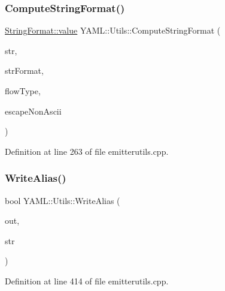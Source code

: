 \subsubsection{\texorpdfstring{ComputeStringFormat()}{ComputeStringFormat()}}
{\footnotesize\ttfamily \mbox{\hyperlink{struct_y_a_m_l_1_1_string_format_aa87d77d0f60417355a95432f16b226e0}{String\+Format\+::value}} Y\+A\+M\+L\+::\+Utils\+::\+Compute\+String\+Format (\begin{DoxyParamCaption}\item[{const \mbox{\hyperlink{glad_8h_ac83513893df92266f79a515488701770}{std\+::string}} \&}]{str,  }\item[{\mbox{\hyperlink{namespace_y_a_m_l_a67c320aa50d3de7ecba1d0b8775dd684}{E\+M\+I\+T\+T\+E\+R\+\_\+\+M\+A\+N\+IP}}}]{str\+Format,  }\item[{\mbox{\hyperlink{struct_y_a_m_l_1_1_flow_type_afc7b0fab097e599c9b49918739e1b5cc}{Flow\+Type\+::value}}}]{flow\+Type,  }\item[{bool}]{escape\+Non\+Ascii }\end{DoxyParamCaption})}



Definition at line 263 of file emitterutils.\+cpp.

\mbox{\label{namespace_y_a_m_l_1_1_utils_a7073e23b2ae04bf248abd3c6fd26a90a}} 
\subsubsection{\texorpdfstring{WriteAlias()}{WriteAlias()}}
{\footnotesize\ttfamily bool Y\+A\+M\+L\+::\+Utils\+::\+Write\+Alias (\begin{DoxyParamCaption}\item[{\mbox{\hyperlink{class_y_a_m_l_1_1ostream__wrapper}{ostream\+\_\+wrapper}} \&}]{out,  }\item[{const \mbox{\hyperlink{glad_8h_ac83513893df92266f79a515488701770}{std\+::string}} \&}]{str }\end{DoxyParamCaption})}



Definition at line 414 of file emitterutils.\+cpp.

\mbox{\label{namespace_y_a_m_l_1_1_utils_afa8f13a74dea4476312947c484d56220}} 
